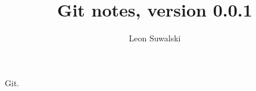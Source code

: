 \documentclass{charun}
\title{Git notes, version 0.0.1}
\author{Leon Suwalski}
\begin{document}
\begin{multicols*}{2}
\maketitle
\raggedright
Git.
\end{multicols*}
\end{document}
